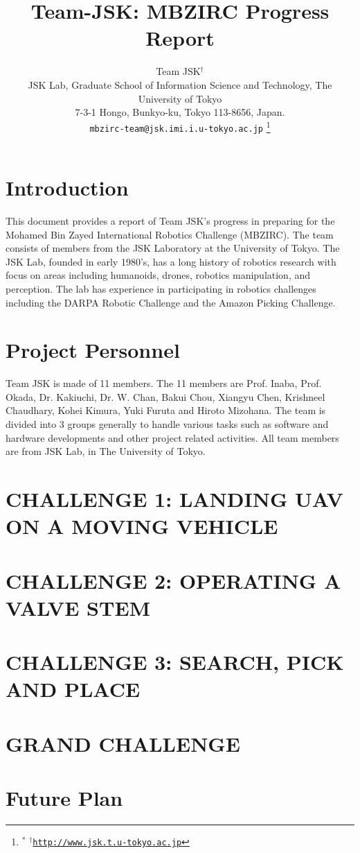\documentclass[letterpaper, 10 pt, conference]{ieeeconf}  %
\title{\LARGE \bf
  Team-JSK: MBZIRC Progress Report
}
\author{Team JSK$^\dagger$%
  \\ JSK Lab, Graduate School of Information Science and Technology, The University of Tokyo \\
  7-3-1 Hongo, Bunkyo-ku, Tokyo 113-8656, Japan.  \\
{\tt\small mbzirc-team@jsk.imi.i.u-tokyo.ac.jp}
\thanks{$^{*}$ %
{$^\dagger$\tt\small \url{http://www.jsk.t.u-tokyo.ac.jp}}
}}
\begin{document}
\maketitle
\thispagestyle{empty}
\pagestyle{empty}


\section{Introduction}
This document provides a report of Team JSK’s progress in preparing for the Mohamed Bin Zayed International Robotics Challenge (MBZIRC). The team consists of members from the JSK Laboratory at the University of Tokyo. The JSK Lab, founded in early 1980’s, has a long history of robotics research with focus on areas including humanoids, drones, robotics manipulation, and perception. The lab has experience in participating in robotics challenges including the DARPA Robotic Challenge and the Amazon Picking Challenge.

\section{Project Personnel}
Team JSK is made of 11 members. The 11 members are Prof. Inaba, Prof. Okada, Dr. Kakiuchi, Dr. W. Chan, Bakui Chou, Xiangyu Chen, Krishneel Chaudhary, Kohei Kimura, Yuki Furuta and Hiroto Mizohana. The team is divided into 3 groups generally to handle various tasks such as software and hardware developments and other project related activities. All team members are from JSK Lab, in The University of Tokyo.




\section{CHALLENGE 1: LANDING UAV ON A MOVING VEHICLE}




\section{CHALLENGE 2: OPERATING A VALVE STEM}


\section{CHALLENGE 3: SEARCH, PICK AND PLACE}




\section{GRAND CHALLENGE}


\section{Future Plan}
\end{document}
